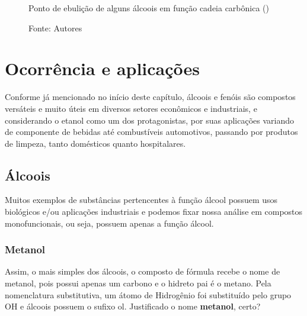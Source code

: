 \begin{figure}[h]
	\caption{Ponto de ebulição de alguns álcoois em função cadeia carbônica (\textcelsius)}
	\label{fig:ebulicao}
	
	\vspace{0.5cm}
	\centering
{}
	\caption*{Fonte: Autores}
\end{figure}

\section{Ocorrência e aplicações}
Conforme já mencionado no início deste capítulo, álcoois e fenóis são compostos versáteis e muito úteis em diversos setores econômicos e industriais, e considerando o etanol como um dos protagonistas, por suas aplicações variando de componente de bebidas até combustíveis automotivos, passando por produtos de limpeza, tanto domésticos quanto hospitalares.

\subsection{Álcoois}
Muitos exemplos de substâncias pertencentes à função álcool possuem usos biológicos e/ou aplicações industriais e podemos fixar nossa análise em compostos monofuncionais, ou seja, possuem apenas a função álcool.

\subsubsection{Metanol}
Assim, o mais simples dos álcoois, o composto de fórmula  recebe o nome de metanol, pois possui apenas um carbono e o hidreto pai é o metano. Pela nomenclatura substitutiva, um átomo de Hidrogênio foi substituído pelo grupo OH e álcoois possuem o sufixo ol. Justificado o nome \textbf{metanol}, certo?

